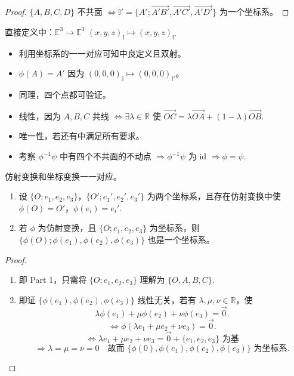 \documentclass[lang=cn,10pt,thmcnt=section]{elegantbook}
\begin{document}
    \begin{proof}
    $\{A, B, C, D\}$ 不共面 $\Leftrightarrow \mathbb{I}' = \{A'; \overrightarrow{A'B'}, \overrightarrow{A'C'}, \overrightarrow{A'D'}\}$ 为一个坐标系。
    \end{proof}
    
    直接定义中：$\mathbb{E}^3 \rightarrow \mathbb{E}^3$ $(x, y, z)_{\mathbb{I}} \mapsto (x, y, z)_{\mathbb{I}'}$
    
    \begin{itemize}
        \item 利用坐标系的一一对应可知中良定义且双射。
        \item $\phi(A) = A'$ 因为 $(0,0,0)_{\mathbb{I}} \mapsto (0,0,0)_{\mathbb{I}'}$。
        \item 同理，四个点都可验证。
        \item 线性，因为 $A, B, C$ 共线 $\Leftrightarrow \exists \lambda \in \mathbb{R}$ 使 $\overrightarrow{OC} = \lambda \overrightarrow{OA} + (1-\lambda) \overrightarrow{OB}$.
        \item 唯一性，若还有中满足所有要求。
        \item 考察 $\phi^{-1}\psi$ 中有四个不共面的不动点 $\Rightarrow \phi^{-1}\psi$ 为 $\text{id}$ $\Rightarrow \phi = \psi$.
    \end{itemize}
    
    \begin{theorem}
    仿射变换和坐标变换一一对应。
    \begin{enumerate}
        \item 设 $\{O; e_1, e_2, e_3\}$，$\{O'; e_1', e_2', e_3'\}$ 为两个坐标系，且存在仿射变换中使 $\phi(O) = O'$，$\phi(e_i) = e_i'$.
        \item 若 $\phi$ 为仿射变换，且 $\{O; e_1, e_2, e_3\}$ 为坐标系，则 $\{\phi(O); \phi(e_1), \phi(e_2), \phi(e_3)\}$ 也是一个坐标系。
    \end{enumerate}
    \end{theorem}
    \begin{proof}
        \begin{enumerate}
            \item 即 Part 1，只需将 $\{O; e_1, e_2, e_3\}$ 理解为 $\{O, A, B, C\}$.
            \item 即证 $\{\phi(e_1), \phi(e_2), \phi(e_3)\}$ 线性无关，若有 $\lambda, \mu, \nu \in \mathbb{R}$，使
            \[
            \lambda \phi(e_1) + \mu \phi(e_2) + \nu \phi(e_3) = \overrightarrow{0}.
            \]
            \[
            \Leftrightarrow \phi(\lambda e_1 + \mu e_2 + \nu e_3) = \overrightarrow{0}.
            \]
            \[
            \Leftrightarrow \lambda e_1 + \mu e_2 + \nu e_3 = \overrightarrow{0} + \{e_1, e_2, e_3\} \text{ 为基}
            \]
            \[
            \Rightarrow \lambda = \mu = \nu = 0 \quad \text{故而 } \{\phi(0), \phi(e_1), \phi(e_2), \phi(e_3)\} \text{ 为坐标系}.
            \]
        \end{enumerate}
    \end{proof}
\end{document}
